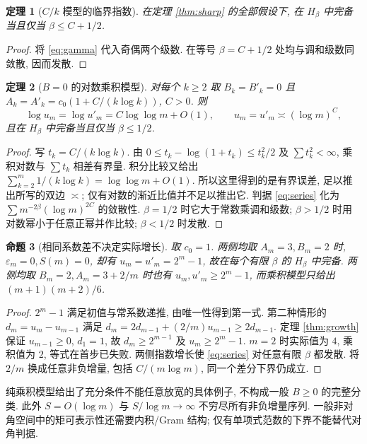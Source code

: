 \documentclass[UTF8]{ctexart}
\newtheorem{theorem}{定理}[section]
\newtheorem{proposition}[theorem]{命题}
\begin{document}
\begin{theorem}[$C/k$ 模型的临界指数]\label{thm:model}
在定理 \ref{thm:sharp} 的全部假设下, 在 $H_\beta$ 中完备
当且仅当 $\beta\le C+1/2$.
\end{theorem}
\begin{proof}
将 \eqref{eq:gamma} 代入奇偶两个级数.
在等号 $\beta=C+1/2$ 处均与调和级数同敛散, 因而发散.
\end{proof}

\begin{theorem}[$B=0$ 的对数乘积模型]\label{thm:line}
对每个 $k\ge2$ 取 $B_k=B'_k=0$ 且
$A_k=A'_k=c_0(1+C/(k\log k))$, $C>0$.
则
\[
\log u_m=\log u'_m=C\log\log m+O(1),\qquad
u_m=u'_m\asymp(\log m)^C,
\]
且在 $H_\beta$ 中完备当且仅当 $\beta\le1/2$.
\end{theorem}
\begin{proof}
写 $t_k=C/(k\log k)$. 由
$0\le t_k-\log(1+t_k)\le t_k^2/2$ 及 $\sum t_k^2<\infty$,
乘积对数与 $\sum t_k$ 相差有界量.
积分比较又给出 $\sum_{k=2}^m1/(k\log k)=\log\log m+O(1)$.
所以这里得到的是有界误差, 足以推出所写的双边 $\asymp$;
仅有对数的渐近比值并不足以推出它.
判据 \eqref{eq:series} 化为
$\sum m^{-2\beta}(\log m)^{2C}$ 的敛散性.
$\beta=1/2$ 时它大于常数乘调和级数;
$\beta>1/2$ 时用对数幂小于任意正幂并作比较; $\beta<1/2$ 时发散.
\end{proof}

\begin{proposition}[相同系数差不决定实际增长]\label{prop:counter-recurrence}
取 $c_0=1$. 两侧均取 $A_m=3,B_m=2$ 时,
$\varepsilon_m=0,S(m)=0$, 却有
$u_m=u'_m=2^m-1$, 故在每个有限 $\beta$ 的 $H_\beta$ 中完备.
两侧均取 $B_m=2,A_m=3+2/m$ 时也有 $u_m,u'_m\ge2^m-1$,
而乘积模型只给出 $(m+1)(m+2)/6$.
\end{proposition}
\begin{proof}
$2^m-1$ 满足初值与常系数递推, 由唯一性得到第一式.
第二种情形的 $d_m=u_m-u_{m-1}$ 满足
$d_m=2d_{m-1}+(2/m)u_{m-1}\ge2d_{m-1}$.
定理 \ref{thm:growth} 保证 $u_{m-1}\ge0$, $d_1=1$,
故 $d_m\ge2^{m-1}$ 及 $u_m\ge2^m-1$.
$m=2$ 时实际值为 $4$, 乘积值为 $2$, 等式在首步已失败.
两侧指数增长使 \eqref{eq:series} 对任意有限 $\beta$ 都发散.
将 $2/m$ 换成任意非负增量, 包括 $C/(m\log m)$,
同一个差分下界仍成立.
\end{proof}

纯乘积模型给出了充分条件不能任意放宽的具体例子,
不构成一般 $B\ge0$ 的完整分类.
此外 $S=O(\log m)$ 与 $S/\log m\to\infty$ 不穷尽所有非负增量序列.
一般非对角空间中的矩可表示性还需要内积/Gram 结构;
仅有单项式范数的下界不能替代对角判据.
\end{document}
